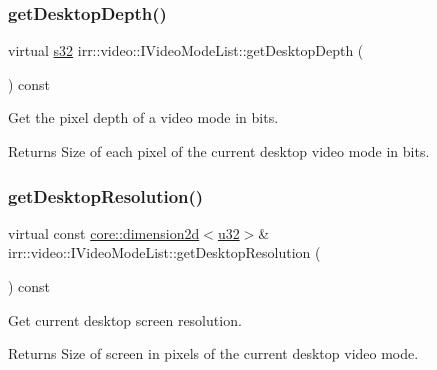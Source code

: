\subsubsection{\texorpdfstring{get\+Desktop\+Depth()}{getDesktopDepth()}}
{\footnotesize\ttfamily virtual \hyperlink{namespaceirr_ac66849b7a6ed16e30ebede579f9b47c6}{s32} irr\+::video\+::\+I\+Video\+Mode\+List\+::get\+Desktop\+Depth (\begin{DoxyParamCaption}{ }\end{DoxyParamCaption}) const\hspace{0.3cm}{\ttfamily [pure virtual]}}



Get the pixel depth of a video mode in bits. 

\begin{DoxyReturn}{Returns}
Size of each pixel of the current desktop video mode in bits. 
\end{DoxyReturn}
\mbox{\label{classirr_1_1video_1_1IVideoModeList_ade99f99922307c1d539bdd35834361fa}} 
\subsubsection{\texorpdfstring{get\+Desktop\+Resolution()}{getDesktopResolution()}}
{\footnotesize\ttfamily virtual const \hyperlink{classirr_1_1core_1_1dimension2d}{core\+::dimension2d}$<$\hyperlink{namespaceirr_a0416a53257075833e7002efd0a18e804}{u32}$>$\& irr\+::video\+::\+I\+Video\+Mode\+List\+::get\+Desktop\+Resolution (\begin{DoxyParamCaption}{ }\end{DoxyParamCaption}) const\hspace{0.3cm}{\ttfamily [pure virtual]}}



Get current desktop screen resolution. 

\begin{DoxyReturn}{Returns}
Size of screen in pixels of the current desktop video mode. 
\end{DoxyReturn}
\mbox{\label{classirr_1_1video_1_1IVideoModeList_a84326f1c6faa1cbbb6f90bdac66714dd}} 
